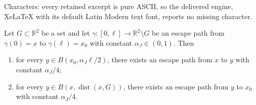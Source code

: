 \documentclass[10pt,a4paper]{amsart}
\DeclareMathOperator{\dist}{dist}
\newcommand{\R}{\mathbb{R}}
\begin{document}
Characters: every retained excerpt is pure ASCII, so the delivered engine, XeLaTeX with its default Latin Modern text font, reports no missing character.
\begin{lemma}
    \label{LemmaJohnSegment}
    Let $G\subset \R^2$ be a set and let $\gamma \colon [0,\ell] \longrightarrow \R^2 \setminus G$ be an escape path from  $\gamma(0) = x$ to $\gamma(\ell)=x_0$ with constant $\alpha_J \in (0,1)$. Then
    \begin{enumerate}[label=(\arabic*)]
        \item for every  $y \in B(x_0, \alpha_J \ell/2)$, there exists an escape path from $x$ to $y$ with constant
            $\alpha_J/4$;
        \item for every $y\in B(x, \dist(x,G))$, there exists an escape path from $y$ to $x_0$ with constant $\alpha_J/4$. 
    \end{enumerate}
\end{lemma}
\end{document}
